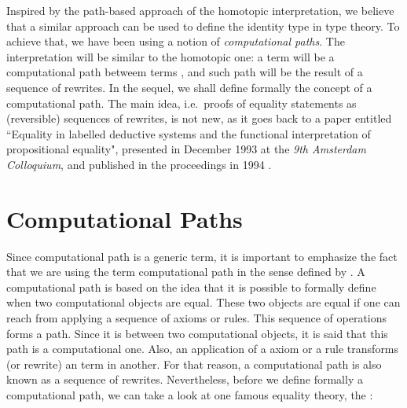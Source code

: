 \documentclass{entcs} \usepackage{entcsmacro}
\begin{document}
Inspired by the path-based approach of the homotopic interpretation, we believe that a similar approach can be used to define the identity type in type theory. To achieve that, we have been using a notion of {\em computational paths}. The interpretation will be similar to the homotopic one: a term  will be a computational path betweem terms , and such path will be the result of a sequence of rewrites. In the sequel, we shall define formally the concept of a computational path. The main idea, i.e.\ proofs of equality statements as (reversible) sequences of rewrites, is not new, as it goes back to a paper entitled ``Equality in labelled deductive systems and the functional interpretation of propositional equality", presented in December 1993 at the {\em 9th Amsterdam Colloquium\/}, and published in the proceedings in 1994 \cite{Ruy4}.

\section{Computational Paths} \label{path}

Since computational path is a generic term, it is important to emphasize the fact that we are using the term computational path in the sense defined by \cite{Ruy5}. A computational path is based on the idea that it is possible to formally define when two computational objects  are equal. These two objects are equal if one can reach  from  applying a sequence of axioms or rules. This sequence of operations forms a path. Since it is between two computational objects, it is said that this path is a computational one. Also, an application of a axiom or a rule transforms (or rewrite) an term in another. For that reason, a computational path is also known as a sequence of rewrites. Nevertheless, before we define formally a computational path, we can take a look at one famous equality theory, the  \cite{lambda}:
\end{document}
